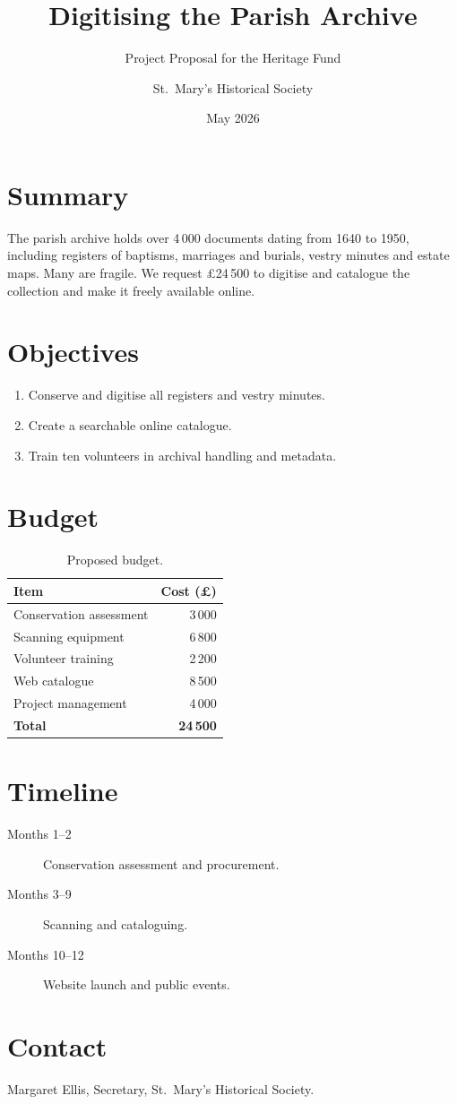 \documentclass[paper=a4,fontsize=11pt,parskip=half]{scrartcl}
\title{Digitising the Parish Archive}
\subtitle{Project Proposal for the Heritage Fund}
\author{St.\ Mary's Historical Society}
\date{May 2026}
\begin{document}
\maketitle

\section{Summary}
The parish archive holds over 4\,000 documents dating from 1640 to 1950, including
registers of baptisms, marriages and burials, vestry minutes and estate maps. Many are
fragile. We request \pounds 24\,500 to digitise and catalogue the collection and make it
freely available online.

\section{Objectives}
\begin{enumerate}
  \item Conserve and digitise all registers and vestry minutes.
  \item Create a searchable online catalogue.
  \item Train ten volunteers in archival handling and metadata.
\end{enumerate}

\section{Budget}
\begin{table}[h]
\centering
\begin{tabular}{lr}
\toprule
Item & Cost (\pounds) \\
\midrule
Conservation assessment & 3\,000 \\
Scanning equipment & 6\,800 \\
Volunteer training & 2\,200 \\
Web catalogue & 8\,500 \\
Project management & 4\,000 \\
\midrule
\textbf{Total} & \textbf{24\,500} \\
\bottomrule
\end{tabular}
\caption{Proposed budget.}
\end{table}

\section{Timeline}
\begin{description}
  \item[Months 1--2] Conservation assessment and procurement.
  \item[Months 3--9] Scanning and cataloguing.
  \item[Months 10--12] Website launch and public events.
\end{description}

\section{Contact}
Margaret Ellis, Secretary, St.\ Mary's Historical Society.
\end{document}
